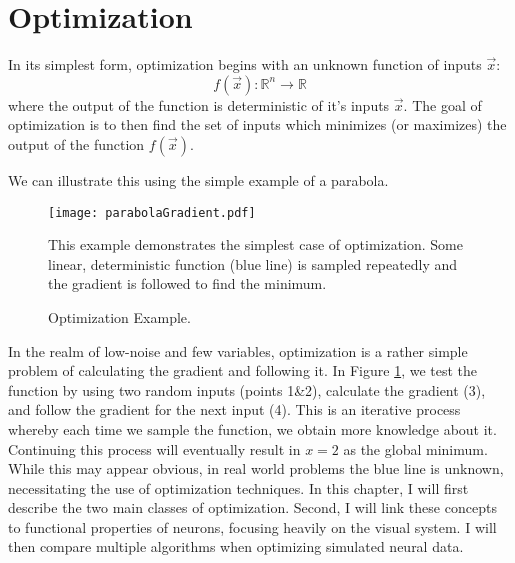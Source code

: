 \section{Optimization}
In its simplest form, optimization begins with an unknown function of inputs $\vec{x}$:
\begin{equation}
	f(\vec{x}) : \mathbb{R}^{n} \rightarrow \mathbb{R}
\end{equation}
where the output of the function is deterministic of it's inputs $\vec{x}$. The goal of optimization is to then find the set of inputs which minimizes (or maximizes) the output of the function $f(\vec{x})$. 

We can illustrate this using the simple example of a parabola. 
\begin{figure}[h]
	\centering
	\texttt{[image: parabolaGradient.pdf]} 
	\caption{Optimization Example.}{This example demonstrates the simplest case of optimization. Some linear, deterministic function (blue line) is sampled repeatedly and the gradient is followed to find the minimum.}
	\label{fig:parabolaGradient}
\end{figure}

In the realm of low-noise and few variables, optimization is a rather simple problem of calculating the gradient and following it. In Figure \ref{fig:parabolaGradient}, we test the function by using two random inputs (points 1\&2), calculate the gradient (3), and follow the gradient for the next input (4). This is an iterative process whereby each time we sample the function, we obtain more knowledge about it. Continuing this process will eventually result in $x=2$ as the global minimum. While this may appear obvious, in real world problems the blue line is unknown, necessitating the use of optimization techniques. In this chapter, I will first describe the two main classes of optimization. Second, I will link these concepts to functional properties of neurons, focusing heavily on the visual system. I will then compare multiple algorithms when optimizing simulated neural data. 


